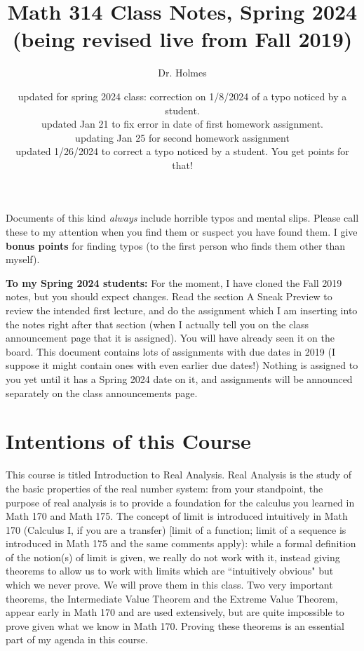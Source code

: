 \documentclass[12pt]{article}
\title{Math 314 Class Notes, Spring 2024 (being revised live from Fall 2019)}
\author{Dr. Holmes}
\date{updated for spring 2024 class:  correction on 1/8/2024 of a typo noticed by a student.\\updated Jan 21 to fix error in date of first homework assignment.  \\ updating Jan 25 for second homework assignment\\updated 1/26/2024 to correct a typo noticed by a student.  You get points for that!}
\begin{document}
\maketitle

\newpage

\tableofcontents

\newpage

Documents of this kind {\em always\/} include horrible typos and mental slips.  Please call these to my attention when you find them or suspect you have found them.  I give {\bf bonus points} for finding typos (to the first person who finds them other than myself).

{\bf To my Spring 2024 students:}  For the moment, I have cloned the Fall 2019 notes, but you should expect changes.   Read the section A Sneak Preview to review the intended first lecture, and do the assignment which I am inserting into the notes right after that section (when I actually tell you on the class announcement page that it is assigned).   You will have already seen it on the board.  This document contains lots of assignments with due dates in 2019 (I suppose it might contain ones with even earlier due dates!)  Nothing is assigned to you yet until it has a Spring 2024 date on it, and assignments will be announced separately on the class announcements page.

\section{Intentions of this Course}

This course is titled Introduction to Real Analysis.  Real Analysis is the study of the basic properties of the real number system:  from your standpoint, the purpose of real analysis is to provide a foundation for the calculus you learned in Math 170 and Math 175.  The concept of limit is introduced intuitively in Math 170 (Calculus I, if you are a transfer) [limit of a function; limit of a sequence is introduced in Math 175 and the same comments apply):  while a formal definition of the notion(s) of limit is given, we really do not work with it, instead giving theorems to allow us to work with limits which are ``intuitively obvious" but which we never prove.  We will prove them in this class.  Two very important theorems, the Intermediate Value Theorem and the Extreme Value Theorem, appear early in Math 170 and are used extensively, but are quite impossible to prove given what we know in Math 170.  Proving these theorems is an essential part of my agenda in this course.
\end{document}
